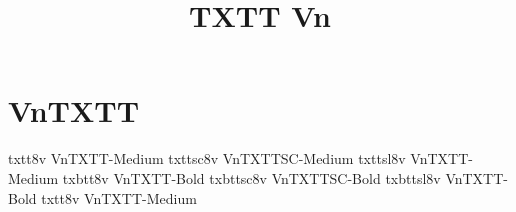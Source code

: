 \documentclass[sample]{vnsample}
\title{TXTT Vn}
\begin{document}
\section{VnTXTT}
   {txtt8v}    {VnTXTT-Medium}
  {txttsc8v}  {VnTXTTSC-Medium}
  {txttsl8v}  {VnTXTT-Medium}
  {txbtt8v}   {VnTXTT-Bold}
 {txbttsc8v} {VnTXTTSC-Bold}
 {txbttsl8v} {VnTXTT-Bold}
   {txtt8v}    {VnTXTT-Medium}
\end{document}
